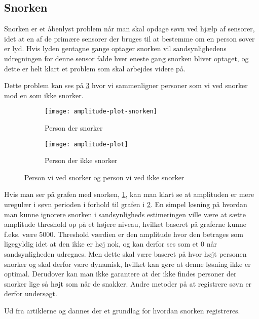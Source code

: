 \subsection{Snorken}\label{section:snorken}
Snorken er et åbenlyst problem når man skal opdage søvn ved hjælp af sensorer, idet at en af de primære sensorer der bruges til at bestemme om en person sover er lyd.
Hvis lyden gentagne gange optager snorken vil sandsynlighedens udregningen for denne sensor falde hver eneste gang snorken bliver optaget, og dette er helt klart et problem som skal arbejdes videre på.

Dette problem kan ses på \cref{fig:snorke-vs-ikkesnorken} hvor vi sammenligner personer som vi ved snorker mod en som ikke snorker.

\begin{figure}
\begin{subfigure}{0.49\textwidth}
\texttt{[image: amplitude-plot-snorken]}
\caption{Person der snorker}
\label{fig:person-snorker}
\end{subfigure}
\begin{subfigure}{0.49\textwidth}
\texttt{[image: amplitude-plot]}
\caption{Person der ikke snorker}
\label{fig:person-ikke-snorker}
\end{subfigure}
\caption{Person vi ved snorker og person vi ved ikke snorker}
\label{fig:snorke-vs-ikkesnorken}
\end{figure}

Hvis man ser på grafen med snorken, \cref{fig:person-snorker}, kan man klart se at amplituden er mere uregulær i søvn perioden i forhold til grafen i \cref{fig:person-ikke-snorker}. 
En simpel løsning på hvordan man kunne ignorere snorken i sandsynligheds estimeringen ville være at sætte amplitude threshold op på et højere niveau, hvilket baseret på graferne kunne f.eks. være 5000. 
Threshold værdien er den amplitude hvor den betrages som ligegyldig idet at den ikke er høj nok, og kan derfor ses som et 0 når sandsynligheden udregnes. 
Men dette skal være baseret på hvor højt personen snorker og skal derfor være dynamisk, hvilket kan gøre at denne løsning ikke er optimal. Derudover kan man ikke garantere at der ikke findes personer der snorker lige så højt som når de snakker.
Andre metoder på at registrere søvn er derfor undersøgt.

Ud fra artiklerne \citet{Dafna2013} og \citet{Calabrese20111101} dannes der et grundlag for hvordan snorken registreres.

